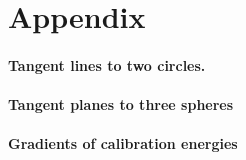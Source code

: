 \section{Appendix}

\paragraph{Tangent lines to two circles.}
\label{app:pillcorr}
% 


\paragraph{Tangent planes to three spheres}
\label{app:wedgecorr}
% 

\paragraph{Gradients of calibration energies}
\label{app:gradients}
% 

